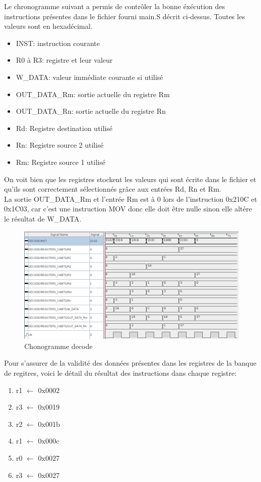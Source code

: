 \documentclass[a4paper]{article} %
\begin{document}
\pagebreak
Le chronogramme suivant a permis de contrôler la bonne éxécution des instructions présentes dans le fichier fourni main.S décrit ci-dessus.
Toutes les valeurs sont en hexadécimal.
\begin{itemize}
    \item     INST: instruction courante
    \item     R0 à R3: registre et leur valeur
    \item    W\_DATA: valeur immédiate courante si utilisé
    \item    OUT\_DATA\_Rm: sortie actuelle du registre Rm
    \item    OUT\_DATA\_Rn: sortie actuelle du registre Rn    
    \item    Rd: Registre destination utilisé
    \item    Rn: Registre source 2 utilisé
    \item    Rm: Registre source 1 utilisé
\end{itemize}
On voit bien que les registres stockent les valeurs qui sont écrite dans le fichier et qu'ils sont correctement sélectionnés grâce aux entrées Rd, Rn et Rm.\\
La sortie OUT\_DATA\_Rm et l'entrée Rm est à 0 lors de l'instruction 0x210C et 0x1C03, car c'est une instruction MOV donc elle doit être nulle sinon elle altére le résultat de W\_DATA.\\

\begin{figure}[H]
    \centering
    \includegraphics[width=1.3\textwidth]{src/Et4_CHRONO_MAIN.png}
    \caption{Chonogramme decode}
    \label{chrono_decode}
\end{figure}
\pagebreak

Pour s'assurer de la validité des données présentes dans les registres de la banque de regitres, voici le détail du résultat des instructions dans chaque registre:
\begin{enumerate}
    \item r1 $\leftarrow$ 0x0002
    \item r3 $\leftarrow$ 0x0019
    \item r2 $\leftarrow$ 0x001b
    \item r1 $\leftarrow$ 0x000c
    \item r0 $\leftarrow$ 0x0027
    \item r3 $\leftarrow$ 0x0027
\end{enumerate}
\end{document}
